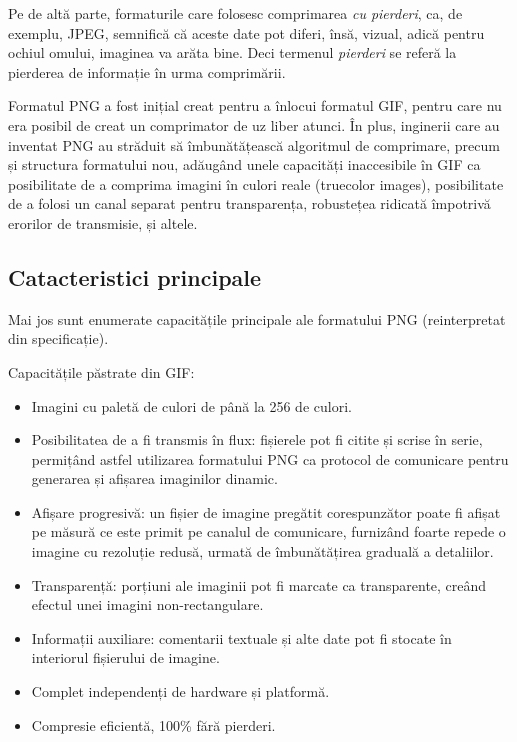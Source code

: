 \documentclass[a4paper,12pt]{report}
\begin{document}
Pe de altă parte, formaturile care folosesc comprimarea \textit{cu pierderi},
ca, de exemplu, \ac{JPEG}, semnifică că aceste date pot diferi,
însă, vizual, adică pentru ochiul omului, imaginea va arăta bine.
Deci termenul \textit{pierderi} se referă la pierderea de informație în urma comprimării.

Formatul \ac{PNG} a fost inițial creat pentru a înlocui formatul \ac{GIF},
pentru care nu era posibil de creat un comprimator de uz liber atunci\cite[12.2.]{png_spec}\cite{gif_unusable_reason}.
În plus, inginerii care au inventat \ac{PNG} au străduit să îmbunătățească algoritmul de comprimare,
precum și structura formatului nou, adăugând unele capacități inaccesibile în \ac{GIF}
ca posibilitate de a comprima imagini în culori reale (truecolor images),
posibilitate de a folosi un canal separat pentru transparența,
robustețea ridicată împotrivă erorilor de transmisie, și altele.

\subsection{Catacteristici principale}

Mai jos sunt enumerate capacitățile principale ale formatului \ac{PNG} (reinterpretat din specificație)\cite[1.]{png_spec}.

Capacitățile păstrate din GIF:

\begin{itemize}
    \item
        Imagini cu paletă de culori de până la 256 de culori.
        
    \item
        Posibilitatea de a fi transmis în flux:
        fișierele pot fi citite și scrise în serie, permițând astfel utilizarea formatului
        PNG ca protocol de comunicare pentru generarea și afișarea imaginilor dinamic.

    \item
        Afișare progresivă: un fișier de imagine pregătit corespunzător poate fi
        afișat pe măsură ce este primit pe canalul de comunicare,
        furnizând foarte repede o imagine cu rezoluție redusă,
        urmată de îmbunătățirea graduală a detaliilor.

    \item
        Transparență: porțiuni ale imaginii pot fi marcate ca transparente,
        creând efectul unei imagini non-rectangulare.

    \item 
        Informații auxiliare: comentarii textuale și alte date pot fi
        stocate în interiorul fișierului de imagine.

    \item
        Complet independenți de hardware și platformă.

    \item
        Compresie eficientă, 100\% fără pierderi.
\end{itemize}
\end{document}
